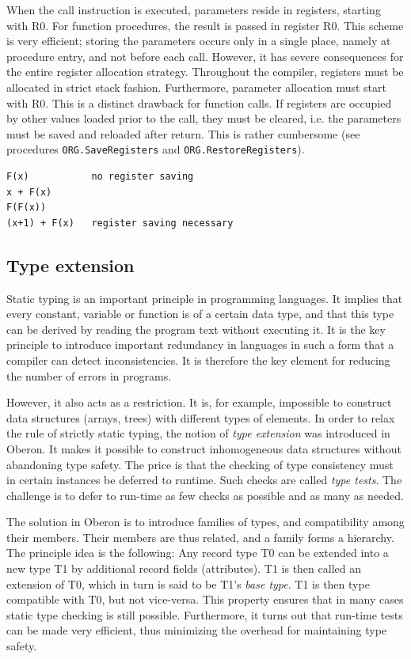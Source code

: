 When the call instruction is executed, parameters reside in registers, starting with R0. For function
procedures, the result is passed in register R0. This scheme is very efficient; storing the parameters
occurs only in a single place, namely at procedure entry, and not before each call. However, it has
severe consequences for the entire register allocation strategy. Throughout the compiler, registers
must be allocated in strict stack fashion. Furthermore, parameter allocation must start with R0. This
is a distinct drawback for function calls. If registers are occupied by other values loaded prior to
the call, they must be cleared, i.e. the parameters must be saved and reloaded after return. This is
rather cumbersome (see procedures \verb|ORG.SaveRegisters| and \verb|ORG.RestoreRegisters|).
\begin{verbatim}
F(x)           no register saving        
x + F(x)        
F(F(x))         
(x+1) + F(x)   register saving necessary
\end{verbatim}

\subsection{Type extension}
Static typing is an important principle in programming languages. It implies that every constant,
variable or function is of a certain data type, and that this type can be derived by reading the
program text without executing it. It is the key principle to introduce important redundancy in
languages in such a form that a compiler can detect inconsistencies. It is therefore the key element
for reducing the number of errors in programs.

However, it also acts as a restriction. It is, for example, impossible to construct data structures
(arrays, trees) with different types of elements. In order to relax the rule of strictly static typing,
the notion of \emph{type extension} was introduced in Oberon.  It makes it possible to construct
inhomogeneous data structures without abandoning type safety. The price is that the checking of type
consistency must in certain instances be deferred to runtime. Such checks are called \emph{type tests}.
The challenge is to defer to run-time as few checks as possible and as many as needed.

The solution in Oberon is to introduce families of types, and compatibility among their members.
Their members are thus related, and a family forms a hierarchy. The principle idea is the following:
Any record type T0 can be extended into a new type T1 by additional record fields (attributes). T1 is
then called an extension of T0, which in turn is said to be T1’s \emph{base type}. T1 is then type
compatible with T0, but not vice-versa. This property ensures that in many cases static type
checking is still possible. Furthermore, it turns out that run-time tests can be made very efficient,
thus minimizing the overhead for maintaining type safety.

